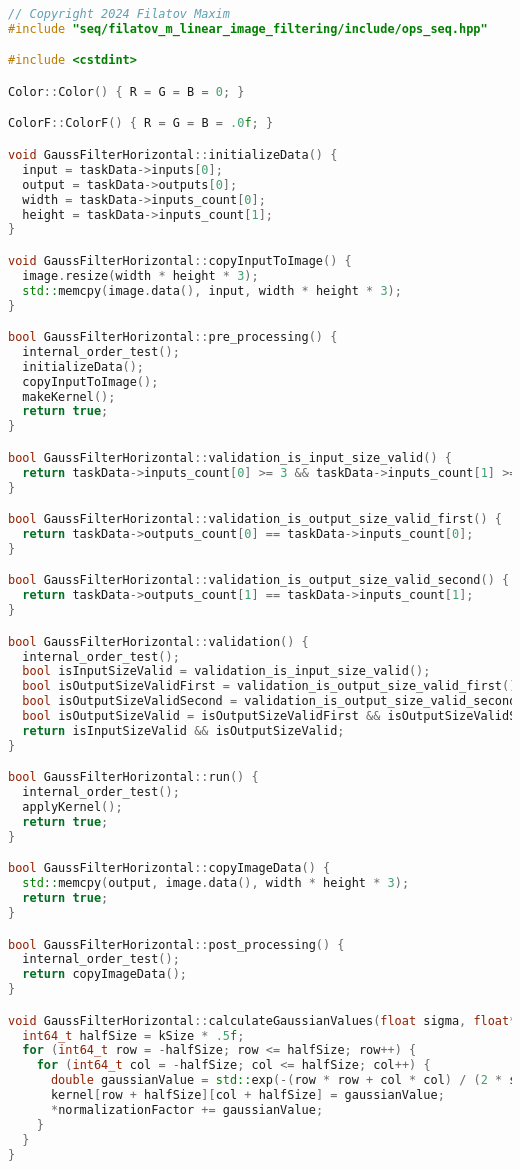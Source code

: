 \documentclass{report}
\begin{document}
\begin{lstlisting}[language=C++,caption=Последовательная версия]
// Copyright 2024 Filatov Maxim
#include "seq/filatov_m_linear_image_filtering/include/ops_seq.hpp"

#include <cstdint>

Color::Color() { R = G = B = 0; }

ColorF::ColorF() { R = G = B = .0f; }

void GaussFilterHorizontal::initializeData() {
  input = taskData->inputs[0];
  output = taskData->outputs[0];
  width = taskData->inputs_count[0];
  height = taskData->inputs_count[1];
}

void GaussFilterHorizontal::copyInputToImage() {
  image.resize(width * height * 3);
  std::memcpy(image.data(), input, width * height * 3);
}

bool GaussFilterHorizontal::pre_processing() {
  internal_order_test();
  initializeData();
  copyInputToImage();
  makeKernel();
  return true;
}

bool GaussFilterHorizontal::validation_is_input_size_valid() {
  return taskData->inputs_count[0] >= 3 && taskData->inputs_count[1] >= 3;
}

bool GaussFilterHorizontal::validation_is_output_size_valid_first() {
  return taskData->outputs_count[0] == taskData->inputs_count[0];
}

bool GaussFilterHorizontal::validation_is_output_size_valid_second() {
  return taskData->outputs_count[1] == taskData->inputs_count[1];
}

bool GaussFilterHorizontal::validation() {
  internal_order_test();
  bool isInputSizeValid = validation_is_input_size_valid();
  bool isOutputSizeValidFirst = validation_is_output_size_valid_first();
  bool isOutputSizeValidSecond = validation_is_output_size_valid_second();
  bool isOutputSizeValid = isOutputSizeValidFirst && isOutputSizeValidSecond;
  return isInputSizeValid && isOutputSizeValid;
}

bool GaussFilterHorizontal::run() {
  internal_order_test();
  applyKernel();
  return true;
}

bool GaussFilterHorizontal::copyImageData() {
  std::memcpy(output, image.data(), width * height * 3);
  return true;
}

bool GaussFilterHorizontal::post_processing() {
  internal_order_test();
  return copyImageData();
}

void GaussFilterHorizontal::calculateGaussianValues(float sigma, float* normalizationFactor) {
  int64_t halfSize = kSize * .5f;
  for (int64_t row = -halfSize; row <= halfSize; row++) {
    for (int64_t col = -halfSize; col <= halfSize; col++) {
      double gaussianValue = std::exp(-(row * row + col * col) / (2 * sigma * sigma));
      kernel[row + halfSize][col + halfSize] = gaussianValue;
      *normalizationFactor += gaussianValue;
    }
  }
}


\end{lstlisting}
\end{document}
